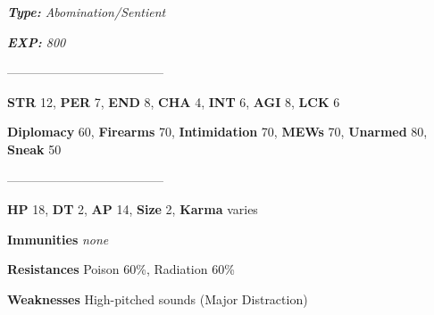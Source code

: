 \documentclass[11pt,a4paper,twocolumn]{book}
\begin{document}
	\noindent
	\emph{\textbf{Type:} Abomination/Sentient}
	
	\noindent
	\emph{\textbf{EXP:} 800}
	
%		
%	
%		

	--------------------------------------

	\noindent
	\textbf{STR} 12, \textbf{PER} 7, \textbf{END} 8, \textbf{CHA} 4, \textbf{INT} 6, \textbf{AGI} 8, \textbf{LCK} 6
	
	\noindent
	\textbf{Diplomacy} 60, \textbf{Firearms} 70, \textbf{Intimidation} 70, \textbf{MEWs} 70, \textbf{Unarmed} 80, \textbf{Sneak} 50
	
	--------------------------------------
	
	\noindent
	\textbf{HP} 18, \textbf{DT} 2, \textbf{AP} 14, \textbf{Size} 2, \textbf{Karma} varies
	
	
	\noindent
	\textbf{Immunities} \emph{none} %
	
	\noindent
	\textbf{Resistances} Poison 60\%, Radiation 60\%%
	
	\noindent
	\textbf{Weaknesses} High-pitched sounds (Major Distraction)%
	
\end{document}

